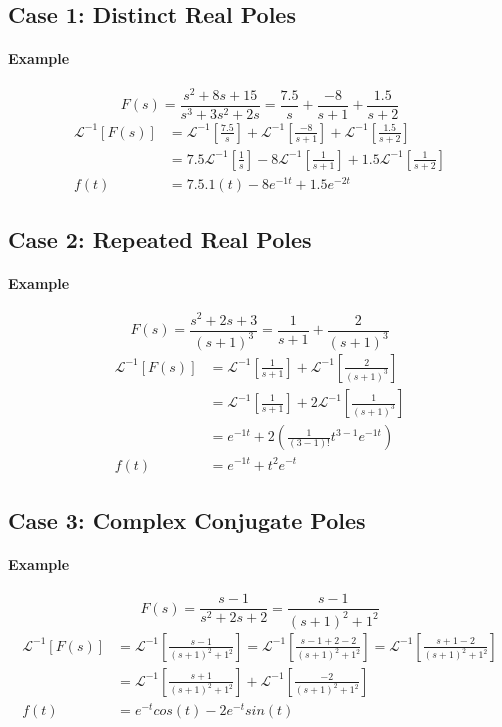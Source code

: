 \subsection{Case 1: Distinct Real Poles}
\paragraph{Example}
\[
F(s) = \frac{s^2+8s+15}{s^3+3s^2+2s} = \frac{7.5}{s} + \frac{-8}{s+1} + \frac{1.5}{s+2}
\]
\[
\begin{split}
	\mathcal{L}^{-1}[F(s)] &= \mathcal{L}^{-1}[\frac{7.5}{s}] + \mathcal{L}^{-1}[\frac{-8}{s+1}] + \mathcal{L}^{-1}[\frac{1.5}{s+2}] \\
	&= 7.5\mathcal{L}^{-1}[\frac{1}{s}] -8\mathcal{L}^{-1}[\frac{1}{s+1}] + 1.5\mathcal{L}^{-1}[\frac{1}{s+2}] \\
	f(t) &= 7.5.1(t) -8e^{-1t} + 1.5e^{-2t}
\end{split}
\]
\subsection{Case 2: Repeated Real Poles}
\paragraph{Example}
\[
F(s) = \frac{s^2+2s+3}{(s+1)^3} = \frac{1}{s+1} + \frac{2}{(s+1)^3}
\]
\[
\begin{split}
	\mathcal{L}^{-1}[F(s)] &= \mathcal{L}^{-1}[\frac{1}{s+1}] + \mathcal{L}^{-1}[\frac{2}{(s+1)^3}] \\
	&= \mathcal{L}^{-1}[\frac{1}{s+1}] + 2\mathcal{L}^{-1}[\frac{1}{(s+1)^3}] \\
	&= e^{-1t} + 2(\frac{1}{(3-1)!}t^{3-1}e^{-1t}) \\
	f(t) &= e^{-1t} + t^2e^{-t}
\end{split}
\]
\subsection{Case 3: Complex Conjugate Poles}
\paragraph{Example}
\[
F(s) = \frac{s-1}{s^2+2s+2} = \frac{s-1}{(s+1)^2+1^2}
\]
\[
\begin{split}
	\mathcal{L}^{-1}[F(s)] &= \mathcal{L}^{-1}[\frac{s-1}{(s+1)^2+1^2}] = \mathcal{L}^{-1}[\frac{s-1+2-2}{(s+1)^2+1^2}] = \mathcal{L}^{-1}[\frac{s+1-2}{(s+1)^2+1^2}] \\
	&= \mathcal{L}^{-1}[\frac{s+1}{(s+1)^2+1^2}] + \mathcal{L}^{-1}[\frac{-2}{(s+1)^2+1^2}] \\
	f(t) &= e^{-t} cos(t) - 2e^{-t} sin(t)
\end{split}
\]

